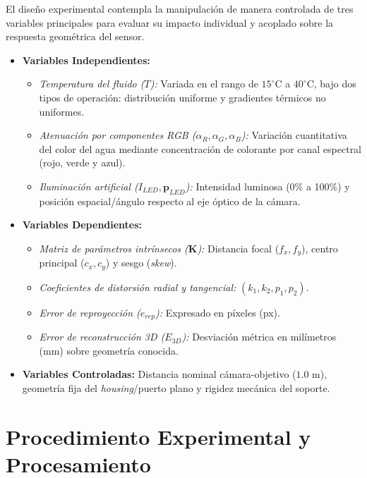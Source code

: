 \documentclass[12pt,letterpaper,spanish,twoside,openright]{report}
\begin{document}
El diseño experimental contempla la manipulación de manera controlada de tres variables principales para evaluar su impacto individual y acoplado sobre la respuesta geométrica del sensor.

\begin{itemize}[noitemsep]
    \item \textbf{Variables Independientes:}
    \begin{itemize}[noitemsep]
        \item \textit{Temperatura del fluido ($T$):} Variada en el rango de $15^\circ\text{C}$ a $40^\circ\text{C}$, bajo dos tipos de operación: distribución uniforme y gradientes térmicos no uniformes.
        \item \textit{Atenuación por componentes RGB ($\alpha_R, \alpha_G, \alpha_B$):} Variación cuantitativa del color del agua mediante concentración de colorante por canal espectral (rojo, verde y azul).
        \item \textit{Iluminación artificial ($I_{LED}, \mathbf{p}_{LED}$):} Intensidad luminosa (0\% a 100\%) y posición espacial/ángulo respecto al eje óptico de la cámara.
    \end{itemize}
    \item \textbf{Variables Dependientes:}
    \begin{itemize}[noitemsep]
        \item \textit{Matriz de parámetros intrínsecos ($\mathbf{K}$):} Distancia focal ($f_x, f_y$), centro principal ($c_x, c_y$) y sesgo (\textit{skew}).
        \item \textit{Coeficientes de distorsión radial y tangencial:} $(k_1, k_2, p_1, p_2)$.
        \item \textit{Error de reproyección ($e_{rep}$):} Expresado en píxeles (px).
        \item \textit{Error de reconstrucción 3D ($E_{3D}$):} Desviación métrica en milímetros (mm) sobre geometría conocida.
    \end{itemize}
    \item \textbf{Variables Controladas:} Distancia nominal cámara-objetivo ($1.0\text{ m}$), geometría fija del \textit{housing}/puerto plano y rigidez mecánica del soporte.
\end{itemize}

\section{Procedimiento Experimental y Procesamiento}
\end{document}
